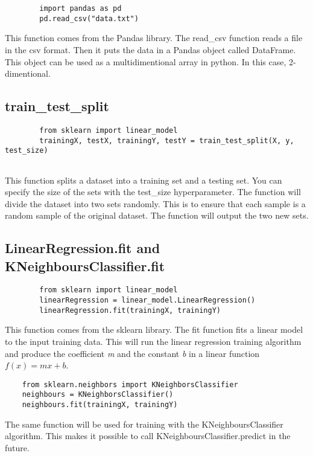 \documentclass[titlepage, 11pt]{article}
\begin{document}
	\begin{lstlisting}
		import pandas as pd
		pd.read_csv("data.txt")
	\end{lstlisting}
	This function comes from the Pandas library. The read\_csv function reads a file in the csv format. Then it puts the data in a Pandas object called DataFrame. This object can be used as a multidimentional array in python. In this case, 2-dimentional.

	\subsection{train\_test\_split}
	
	\begin{lstlisting}
		from sklearn import linear_model
		trainingX, testX, trainingY, testY = train_test_split(X, y, test_size)
		
	\end{lstlisting}
	This function splits a dataset into a training set and a testing set. You can specify the size of the sets with the test\_size hyperparameter. The function will divide the dataset into two sets randomly. This is to ensure that each sample is a random sample of the original dataset. The function will output the two new sets.
	
	\subsection{LinearRegression.fit and KNeighboursClassifier.fit}
	
	\begin{lstlisting}
		from sklearn import linear_model
		linearRegression = linear_model.LinearRegression()
		linearRegression.fit(trainingX, trainingY)
	\end{lstlisting}
	This function comes from the sklearn library. The fit function fits a linear model to the input training data. This will run the linear regression training algorithm and produce the coefficient \emph{m} and the constant \emph{b} in a linear function $ f(x) = mx + b $.
	
	\begin{lstlisting}
	from sklearn.neighbors import KNeighborsClassifier
	neighbours = KNeighborsClassifier()
	neighbours.fit(trainingX, trainingY)
	\end{lstlisting}
	The same function will be used for training with the KNeighboursClassifier algorithm. This makes it possible to call KNeighboursClassifier.predict in the future.
	
\end{document}
